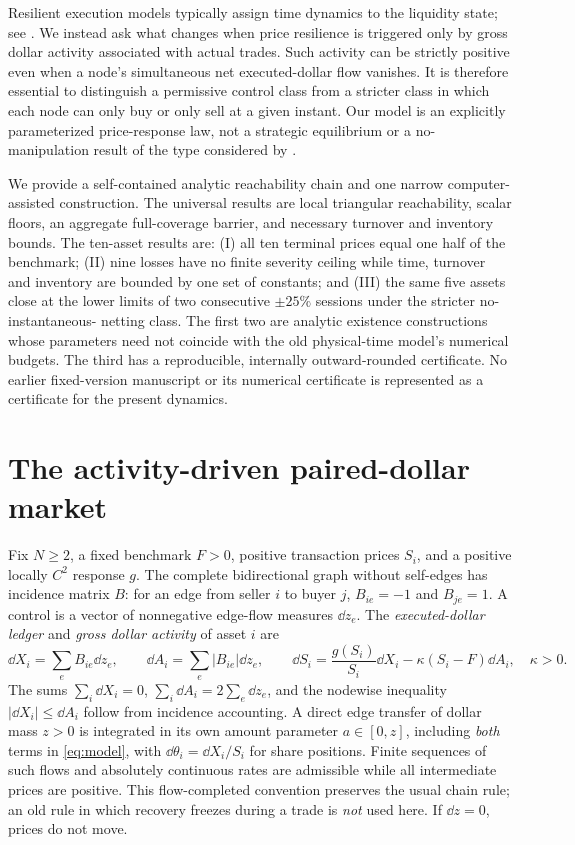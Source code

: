 \documentclass[review,hidelinks,onefignum,onetabnum]{siamonline250211}%
\begin{document}
Resilient execution models typically assign time dynamics to the liquidity
state; see \citet{ObizhaevaWang2013,AlfonsiSchied2010}. We instead ask what
changes when price resilience is triggered only by gross dollar activity
associated with actual trades. Such activity can be strictly positive even
when a node's simultaneous net executed-dollar flow vanishes. It is therefore
essential to distinguish a permissive control class from a stricter class
in which each node can only buy or only sell at a given instant. Our model
is an explicitly parameterized price-response law, not a strategic equilibrium
or a no-manipulation result of the type considered by
\citet{Gatheral2010,HubermanStanzl2004}.

We provide a self-contained analytic reachability chain and one narrow
computer-assisted construction. The universal results are local triangular
reachability, scalar floors, an aggregate full-coverage barrier, and necessary
turnover and inventory bounds. The ten-asset results are: (I) all ten
terminal prices equal one half of the benchmark; (II) nine losses have no
finite severity ceiling while time, turnover and inventory are bounded by
one set of constants; and (III) the same five assets close at the lower limits
of two consecutive $\pm25\%$ sessions under the stricter no-instantaneous-
netting class. The first two are analytic existence constructions whose
parameters need not coincide with the old physical-time model's numerical
budgets. The third has a reproducible, internally outward-rounded certificate.
No earlier fixed-version manuscript or its numerical certificate is
represented as a certificate for the present dynamics.

\section{The activity-driven paired-dollar market}\label{sec:model}
Fix $N\ge2$, a fixed benchmark $F>0$, positive transaction prices $S_i$,
and a positive locally $C^2$ response $g$. The complete bidirectional graph
without self-edges has incidence matrix $B$: for an edge from seller $i$ to
buyer $j$, $B_{ie}=-1$ and $B_{je}=1$. A control is a vector of nonnegative
edge-flow measures $\dd z_e$. The \emph{executed-dollar ledger} and \emph{gross
dollar activity} of asset $i$ are
\begin{equation}\label{eq:model}
 \dd X_i=\sum_e B_{ie}\dd z_e,\qquad
 \dd A_i=\sum_e|B_{ie}|\dd z_e,\qquad
 \boxed{\dd S_i=\frac{g(S_i)}{S_i}\dd X_i-\kappa(S_i-F)\dd A_i},\quad\kappa>0.
\end{equation}
The sums $\sum_i\dd X_i=0$, $\sum_i\dd A_i=2\sum_e\dd z_e$, and the
nodewise inequality $|\dd X_i|\le\dd A_i$ follow from incidence accounting.
A direct edge transfer of dollar mass $z>0$ is integrated in its own amount
parameter $a\in[0,z]$, including \emph{both} terms in \eqref{eq:model},
with $\dd\theta_i=\dd X_i/S_i$ for share positions. Finite sequences of such
flows and absolutely continuous rates are admissible while all intermediate
prices are positive. This flow-completed convention preserves the usual
chain rule; an old rule in which recovery freezes during a trade is \emph{not}
used here. If $\dd z=0$, prices do not move.
\end{document}
